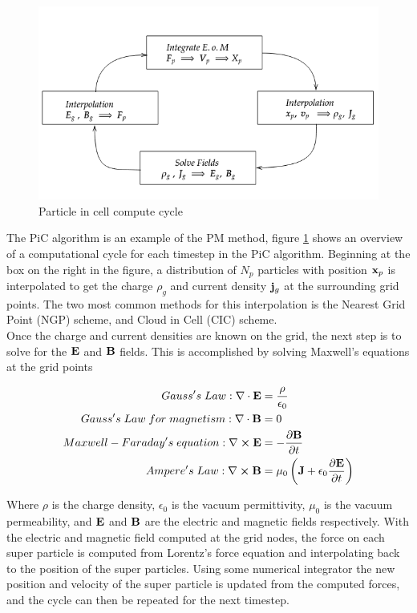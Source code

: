\begin{figure}[h!]
    \centering
    \includegraphics[scale=0.6]{figures/ReferenceFigures/PiC.png}
    \caption{Particle in cell compute cycle}
    \label{fig:pic}
\end{figure}

The PiC algorithm is an example of the PM method, figure \ref{fig:pic} shows an overview of a computational cycle for each timestep in the PiC algorithm. Beginning at the box on the right in the figure, a distribution of $N_p$ particles with position $\vb{x}_p$ is interpolated to get the charge $\rho_g$ and current density $\vb{j}_g$ at the surrounding grid points. The two most common methods for this interpolation is the Nearest Grid Point (NGP) scheme, and Cloud in Cell (CIC) scheme.\\
Once the charge and current densities are known on the grid, the next step is to solve for the $\vb{E}$ and $\vb{B}$ fields. This is accomplished by solving Maxwell's equations at the grid points

\begin{subequations}
    \begin{align}
        Gauss's\; Law: \nabla \cdot \vb{E} &= \frac{\rho}{\epsilon_0} \label{eq:gauss} \\
        Gauss's\; Law\; for\; magnetism: \nabla \cdot \vb{B} &= 0 \\
        Maxwell - Faraday's\; equation: \nabla \cross \vb{E} &= - \pdv{\vb{B}}{t}\\
        Ampere's\; Law: \nabla \cross \vb{B} &= \mu_0 \left(\vb{J} + \epsilon_0 \pdv{\vb{E}}{t} \right)
    \end{align}
\end{subequations}

Where $\rho$ is the charge density, $\epsilon_0$ is the vacuum permittivity, $\mu_0$ is the vacuum permeability, and $\vb{E}$ and $\vb{B}$ are the electric and magnetic fields respectively. With the electric and magnetic field computed at the grid nodes, the force on each super particle is computed from Lorentz's force equation and interpolating back to the position of the super particles. Using some numerical integrator the new position and velocity of the super particle is updated from the computed forces, and the cycle can then be repeated for the next timestep. 

